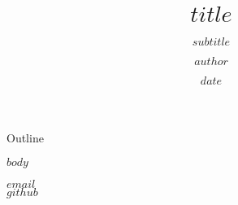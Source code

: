 \documentclass{beamer}
\title{$title$}
\subtitle{$subtitle$}
\author{$author$}
\institute{@$university$}
\date{$date$}
\begin{document}
\begin{frame}
  \titlepage
\end{frame}

\begin{frame}{Outline}
\tableofcontents
\end{frame}

$body$

\begin{frame}[plain]
\begin{center}
  \faEnvelope $email$\\
  \vspace{1cm}
  \faGithub \href{$github$}{$github$}
\end{center}
\end{frame}
\end{document}
